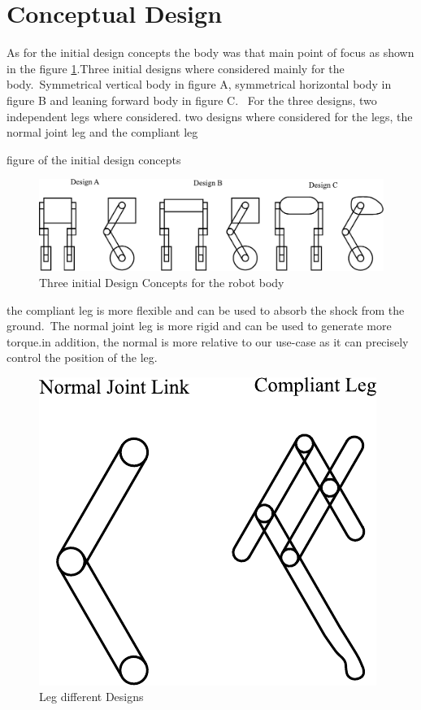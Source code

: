 \section{Conceptual Design}
As for the initial design concepts the body was that main point of focus as shown in the figure \ref{fig:initialdesigns}.Three initial designs where considered mainly for the body.\ Symmetrical vertical body in figure A, symmetrical horizontal body in figure B and leaning forward body in figure C.
\ For the three designs, two independent legs where considered.
two designs where considered for the legs, the normal joint leg and the compliant leg

 figure of the initial design concepts
\begin{figure}[h]
	\centering
	\includegraphics[width=1\linewidth]{Conceptual Design}
	\caption[Initial Design Concepts TEST]{Three initial Design Concepts for the robot body}
	\label{fig:initialdesigns}
\end{figure}



the compliant leg is more flexible and can be used to absorb the shock from the ground.\ The normal joint leg is more rigid and can be used to generate more torque.in addition, the normal is more relative to our use-case as it can precisely control the position of the leg.


\begin{figure}[h]
	\centering
	\includegraphics[width=0.4\linewidth]{Leg Design}
	\caption[between brakets for leg design]{Leg different Designs }
	\label{fig:legdesignsjbhi}
\end{figure}




